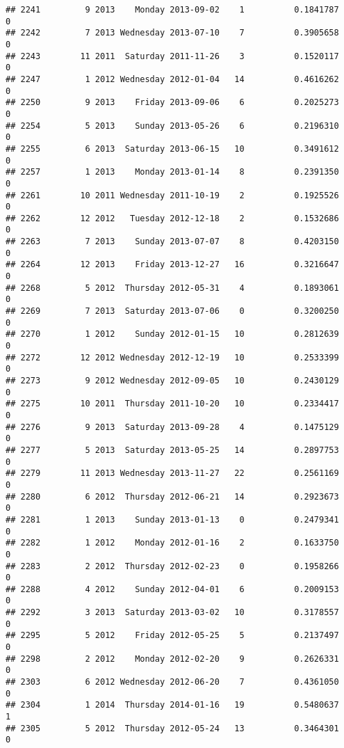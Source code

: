 \documentclass[
]{article}
\begin{document}
\begin{verbatim}
## 2241         9 2013    Monday 2013-09-02    1          0.1841787             0
## 2242         7 2013 Wednesday 2013-07-10    7          0.3905658             0
## 2243        11 2011  Saturday 2011-11-26    3          0.1520117             0
## 2247         1 2012 Wednesday 2012-01-04   14          0.4616262             0
## 2250         9 2013    Friday 2013-09-06    6          0.2025273             0
## 2254         5 2013    Sunday 2013-05-26    6          0.2196310             0
## 2255         6 2013  Saturday 2013-06-15   10          0.3491612             0
## 2257         1 2013    Monday 2013-01-14    8          0.2391350             0
## 2261        10 2011 Wednesday 2011-10-19    2          0.1925526             0
## 2262        12 2012   Tuesday 2012-12-18    2          0.1532686             0
## 2263         7 2013    Sunday 2013-07-07    8          0.4203150             0
## 2264        12 2013    Friday 2013-12-27   16          0.3216647             0
## 2268         5 2012  Thursday 2012-05-31    4          0.1893061             0
## 2269         7 2013  Saturday 2013-07-06    0          0.3200250             0
## 2270         1 2012    Sunday 2012-01-15   10          0.2812639             0
## 2272        12 2012 Wednesday 2012-12-19   10          0.2533399             0
## 2273         9 2012 Wednesday 2012-09-05   10          0.2430129             0
## 2275        10 2011  Thursday 2011-10-20   10          0.2334417             0
## 2276         9 2013  Saturday 2013-09-28    4          0.1475129             0
## 2277         5 2013  Saturday 2013-05-25   14          0.2897753             0
## 2279        11 2013 Wednesday 2013-11-27   22          0.2561169             0
## 2280         6 2012  Thursday 2012-06-21   14          0.2923673             0
## 2281         1 2013    Sunday 2013-01-13    0          0.2479341             0
## 2282         1 2012    Monday 2012-01-16    2          0.1633750             0
## 2283         2 2012  Thursday 2012-02-23    0          0.1958266             0
## 2288         4 2012    Sunday 2012-04-01    6          0.2009153             0
## 2292         3 2013  Saturday 2013-03-02   10          0.3178557             0
## 2295         5 2012    Friday 2012-05-25    5          0.2137497             0
## 2298         2 2012    Monday 2012-02-20    9          0.2626331             0
## 2303         6 2012 Wednesday 2012-06-20    7          0.4361050             0
## 2304         1 2014  Thursday 2014-01-16   19          0.5480637             1
## 2305         5 2012  Thursday 2012-05-24   13          0.3464301             0

\end{verbatim}
\end{document}
